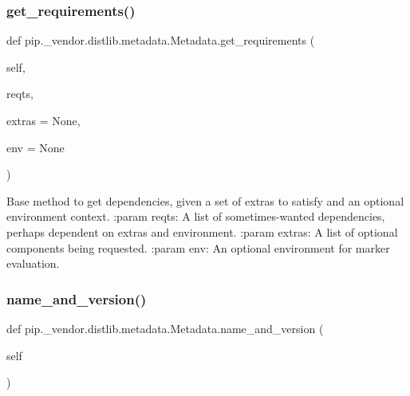 \mbox{\label{classpip_1_1__vendor_1_1distlib_1_1metadata_1_1Metadata_a372528ac411fd419ac0f6ff4306e7290}} 
\subsubsection{\texorpdfstring{get\+\_\+requirements()}{get\_requirements()}}
{\footnotesize\ttfamily def pip.\+\_\+vendor.\+distlib.\+metadata.\+Metadata.\+get\+\_\+requirements (\begin{DoxyParamCaption}\item[{}]{self,  }\item[{}]{reqts,  }\item[{}]{extras = {\ttfamily None},  }\item[{}]{env = {\ttfamily None} }\end{DoxyParamCaption})}

\begin{DoxyVerb}Base method to get dependencies, given a set of extras
to satisfy and an optional environment context.
:param reqts: A list of sometimes-wanted dependencies,
      perhaps dependent on extras and environment.
:param extras: A list of optional components being requested.
:param env: An optional environment for marker evaluation.
\end{DoxyVerb}
 \mbox{\label{classpip_1_1__vendor_1_1distlib_1_1metadata_1_1Metadata_a958dc84c5959001c3c94c99c262c8268}} 
\subsubsection{\texorpdfstring{name\+\_\+and\+\_\+version()}{name\_and\_version()}}
{\footnotesize\ttfamily def pip.\+\_\+vendor.\+distlib.\+metadata.\+Metadata.\+name\+\_\+and\+\_\+version (\begin{DoxyParamCaption}\item[{}]{self }\end{DoxyParamCaption})}

